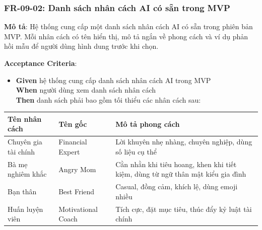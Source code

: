 \subsubsection{FR-09-02: Danh sách nhân cách AI có sẵn trong MVP}

\textbf{Mô tả}: Hệ thống cung cấp một danh sách nhân cách AI có sẵn trong phiên bản MVP. Mỗi nhân cách có tên hiển thị, mô tả ngắn về phong cách và ví dụ phản hồi mẫu để người dùng hình dung trước khi chọn.



\textbf{Acceptance Criteria}:

\begin{itemize}
\item \textbf{Given} hệ thống cung cấp danh sách nhân cách AI trong MVP  \\ \hspace*{1.5em}  \textbf{When} người dùng xem danh sách nhân cách  \\ \hspace*{1.5em}  \textbf{Then} danh sách phải bao gồm tối thiểu các nhân cách sau:
\end{itemize}
\begin{table}[htbp]
\centering
\begin{tabularx}{\textwidth}{|l|l|X|}
\hline
Tên nhân cách & Tên gốc & Mô tả phong cách \\ \hline
Chuyên gia tài chính & Financial Expert & Lời khuyên nhẹ nhàng, chuyên nghiệp, dùng số liệu cụ thể \\ \hline
Bà mẹ nghiêm khắc & Angry Mom & Cằn nhằn khi tiêu hoang, khen khi tiết kiệm, dùng từ ngữ thân mật kiểu gia đình \\ \hline
Bạn thân & Best Friend & Casual, đồng cảm, khích lệ, dùng emoji nhiều \\ \hline
Huấn luyện viên & Motivational Coach & Tích cực, đặt mục tiêu, thúc đẩy kỷ luật tài chính \\ \hline
\end{tabularx}
\end{table}




